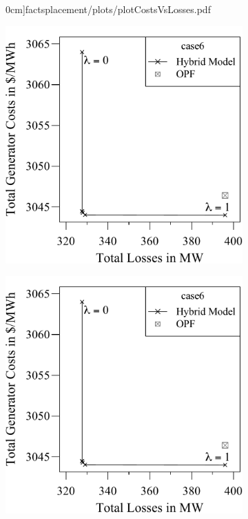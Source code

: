 \begin{figure}[t!]
\begin{subfigure}[t]{.45\textwidth}
        0cm]{factsplacement/plots/plotCostsVsLosses.pdf}
    \label{ch:appendix:sec:facts:fig:plot-costs-losses-case9}
\end{subfigure}

\begin{subfigure}[t]{.45\textwidth}
    \centering
        \includegraphics[width=0.95\linewidth, page=3,trim=0cm 0cm 0cm
        0cm]{factsplacement/plots/plotCostsVsLosses.pdf}
\end{subfigure}
\hfill
\begin{subfigure}[t]{.45\textwidth}
    \centering
        \includegraphics[width=0.95\linewidth, page=5,trim=0cm 0cm 0cm 0cm]{factsplacement/plots/plotCostsVsLosses.pdf}
    \label{ch:appendix:sec:facts:fig:plot-costs-losses-case39}
\end{subfigure}


\end{figure}
